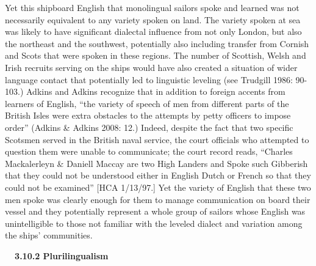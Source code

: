 \begin{styleStandard}
Yet this shipboard English that monolingual sailors spoke and learned was not necessarily equivalent to any variety spoken on land. The variety spoken at sea was likely to have significant dialectal influence from not only London, but also the northeast and the southwest, potentially also including transfer from Cornish and Scots that were spoken in these regions. The number of Scottish, Welsh and Irish recruits serving on the ships would have also created a situation of wider language contact that potentially led to linguistic leveling (see Trudgill 1986: 90-103.) Adkins and Adkins recognize that in addition to foreign accents from learners of English, “the variety of speech of men from different parts of the British Isles were extra obstacles to the attempts by petty officers to impose order” (Adkins \& Adkins 2008: 12.) Indeed, despite the fact that two specific Scotsmen served in the British naval service, the court officials who attempted to question them were unable to communicate; the court record reads, “Charles Mackalerleyn \& Daniell Maccay are two High Landers and Spoke such Gibberish that they could not be understood either in English Dutch or French so that they could not be examined” [HCA 1/13/97.] Yet the variety of English that these two men spoke was clearly enough for them to manage communication on board their vessel and they potentially represent a whole group of sailors whose English was unintelligible to those not familiar with the leveled dialect and variation among the ships’ communities. 
\end{styleStandard}

\begin{styleStandard}
\textbf{\ \ 3.10.2 Plurilingualism}
\end{styleStandard}

